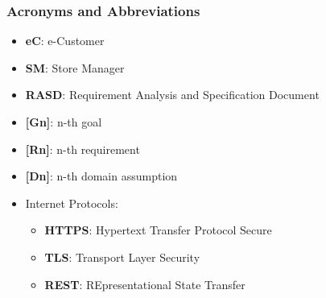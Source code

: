 \subsubsection{Acronyms and Abbreviations}
\begin{itemize}[itemsep=-1mm, topsep=-1mm]
	\item \textbf{eC}: e-Customer
	\item \textbf{SM}: Store Manager
	\item \textbf{RASD}: Requirement Analysis and Specification Document
	\item \textbf{[Gn]}: n-th goal
	\item \textbf{[Rn]}: n-th requirement
	\item \textbf{[Dn]}: n-th domain assumption
	\item Internet Protocols:
	\begin{itemize}[itemsep=-1mm, topsep=-1mm]
		\item \textbf{HTTPS}: Hypertext Transfer Protocol Secure 
		\item \textbf{TLS}: Transport Layer Security
		\item \textbf{REST}: REpresentational State Transfer
	\end{itemize}
\end{itemize}	